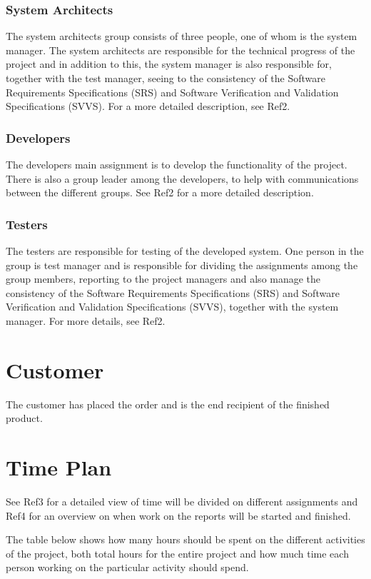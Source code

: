 \documentclass[a4paper]{article}
\begin{document}
\subsubsection{System Architects}
The system architects group consists of three people, one of whom is the system manager. The system architects are responsible for the technical progress of the project and in addition to this, the system manager is also responsible for, together with the test manager, seeing to the consistency of the Software Requirements Specifications (SRS) and Software Verification and Validation Specifications (SVVS). For a more detailed description, see Ref2.

\subsubsection{Developers}
The developers main assignment is to develop the functionality of the project. There is also a group leader among the developers, to help with communications between the different groups. See Ref2 for a more detailed description.

\subsubsection{Testers}
The testers are responsible for testing of the developed system. One person in the group is test manager and is responsible for dividing the assignments among the group members, reporting to the project managers and also manage the consistency of the Software Requirements Specifications (SRS) and Software Verification and Validation Specifications (SVVS), together with the system manager. For more details, see Ref2.

\section{Customer}
The customer has placed the order and is the end recipient of the finished product.

\section{Time Plan}
See Ref3 for a detailed view of time will be divided on different assignments and Ref4 for an overview on when work on the reports will be started and finished.

The table below shows how many hours should be spent on the different activities of the project, both total hours for the entire project and how much time each person working on the particular activity should spend.
\end{document}
